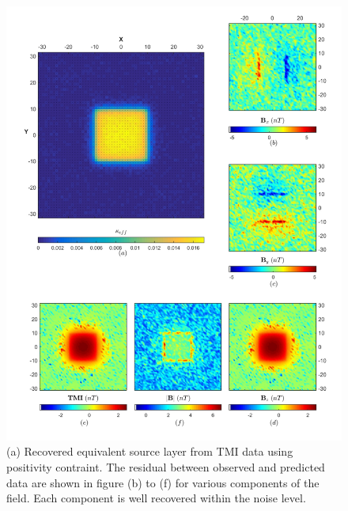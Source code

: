 \begin{figure}[h!]
\includegraphics[scale=0.60]{ES_Li_Full_Space}
\caption{(a) Recovered equivalent source layer from TMI data using positivity contraint. The residual between observed and predicted data are shown in figure (b) to (f) for various components of the field. Each component is well recovered within the noise level.}
\label{fig:ES_Li_Full_Space}
\end{figure}

